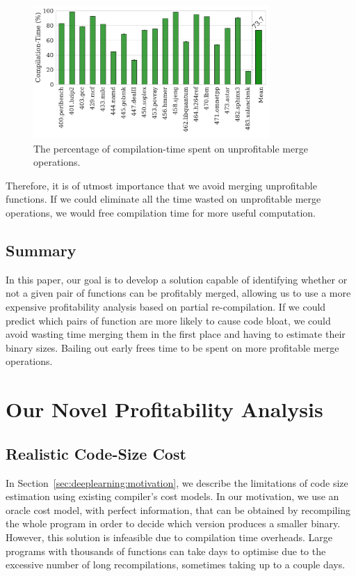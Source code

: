 \begin{figure}[h]
  \centering
  \includegraphics[width=0.8\textwidth]{src/deeplearning/figs/unprofitable-compile-time-percentage.pdf}
  \caption{The percentage of compilation-time spent on unprofitable merge operations.}
  \label{fig:unprofitable-compile-time-percentage}
\end{figure}

Therefore, it is of utmost importance that we avoid merging unprofitable functions.
If we could eliminate all the time wasted on unprofitable merge operations, we would free compilation time for more useful computation.

\subsection{Summary}

In this paper, our goal is to develop a solution capable of identifying whether or not a given pair of functions can be profitably merged, allowing us to use a more expensive profitability analysis based on partial re-compilation.
If we could predict which pairs of function are more likely to cause code bloat, we could avoid wasting time merging them in the first place and having to estimate their binary sizes.
Bailing out early frees time to be spent on more profitable merge operations.

\section{Our Novel Profitability Analysis}

\subsection{Realistic Code-Size Cost}

In Section~\ref{sec:deeplearning:motivation}, we describe the limitations of code size estimation using existing compiler's cost models.
In our motivation, we use an oracle cost model, with perfect information, that can be obtained by recompiling the whole program in order to decide which version produces a smaller binary.
However, this solution is infeasible due to compilation time overheads.
Large programs with thousands of functions can take days to optimise due to the excessive number of long recompilations, sometimes taking up to a couple days.

